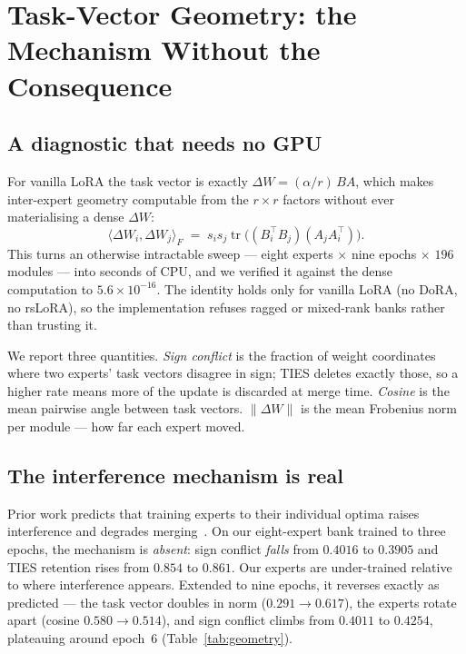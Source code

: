 \documentclass[sigconf,review,anonymous]{acmart}
\begin{document}
\section{Task-Vector Geometry: the Mechanism Without the Consequence}
\label{sec:geometry}

\subsection{A diagnostic that needs no GPU}

For vanilla LoRA the task vector is exactly $\Delta W = (\alpha/r)\,BA$, which makes inter-expert
geometry computable from the $r\times r$ factors without ever materialising a dense $\Delta W$:
\[
\langle \Delta W_i, \Delta W_j\rangle_F \;=\; s_i s_j \operatorname{tr}\!\big((B_i^{\top} B_j)(A_j A_i^{\top})\big).
\]
This turns an otherwise intractable sweep --- eight experts $\times$ nine epochs $\times$ $196$
modules --- into seconds of CPU, and we verified it against the dense computation to
$5.6\times10^{-16}$. The identity holds only for vanilla LoRA (no DoRA, no rsLoRA), so the
implementation refuses ragged or mixed-rank banks rather than trusting it.

We report three quantities. \emph{Sign conflict} is the fraction of weight coordinates where two
experts' task vectors disagree in sign; TIES deletes exactly those, so a higher rate means more
of the update is discarded at merge time. \emph{Cosine} is the mean pairwise angle between task
vectors. $\|\Delta W\|$ is the mean Frobenius norm per module --- how far each expert moved.

\subsection{The interference mechanism is real}

Prior work predicts that training experts to their individual optima raises interference and
degrades merging~\cite{horoi2025less}. On our eight-expert bank trained to three epochs, the
mechanism is \emph{absent}: sign conflict \emph{falls} from $0.4016$ to $0.3905$ and TIES
retention rises from $0.854$ to $0.861$. Our experts are under-trained relative to where
interference appears. Extended to nine epochs, it reverses exactly as predicted --- the task
vector doubles in norm ($0.291 \to 0.617$), the experts rotate apart (cosine $0.580 \to 0.514$),
and sign conflict climbs from $0.4011$ to $0.4254$, plateauing around epoch~$6$
(Table~\ref{tab:geometry}).
\end{document}
